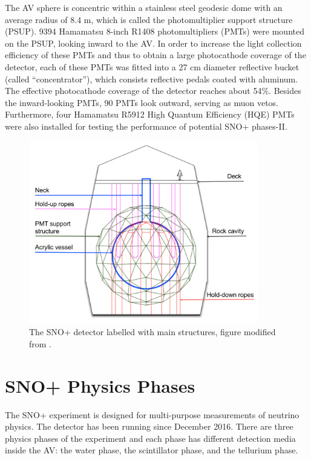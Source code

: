 The AV sphere is concentric within a stainless steel geodesic dome with an average radius of 8.4 m, which is called the photomultiplier support structure (PSUP). 9394 Hamamatsu 8-inch R1408 photomultipliers (PMTs) were mounted on the PSUP, looking inward to the AV. In order to increase the light collection efficiency of these PMTs and thus to obtain a large photocathode coverage of the detector, each of these PMTs was fitted into a 27 cm diameter reflective bucket (called ``concentrator''), which consists reflective pedals coated with aluminum. The effective photocathode coverage of the detector reaches about 54\%\cite{whitepaper}. Besides the inward-looking PMTs, 90 PMTs look outward, serving as muon vetos. Furthermore, four Hamamatsu R5912 High Quantum Efficiency (HQE) PMTs were also installed for testing the performance of potential SNO+ phases-II\cite{stringer2019sensitivity}. 

\begin{figure}[htbp]
	\centering
	\includegraphics[width=10cm]{SNOPdetector.png}
	\caption{The SNO+ detector labelled with main structures, figure modified from \cite{jones2011background}.}
	\label{snopdetector}
\end{figure}

\section{SNO+ Physics Phases}
The SNO+ experiment is designed for multi-purpose measurements of neutrino physics. The detector has been running since December 2016. There are three physics phases of the experiment and each phase has different detection media inside the AV: the water phase, the scintillator phase, and the tellurium phase\cite{whitepaper}. 

